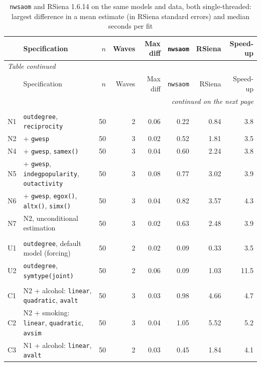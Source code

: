 {\footnotesize
\begin{longtable}{l>{\raggedright\arraybackslash}p{}rrrrrr}
\caption{\texttt{nwsaom} and RSiena 1.6.14 on the same models and data, both single-threaded: largest difference in a mean estimate (in RSiena standard errors) and median seconds per fit}\label{tab:bench}\\
\toprule
 & Specification & $n$ & Waves & Max diff & \texttt{nwsaom} & RSiena & Speed-up \\
\midrule
\endfirsthead
\multicolumn{8}{l}{\textit{Table \thetable{} continued}}\\
\toprule
 & Specification & $n$ & Waves & Max diff & \texttt{nwsaom} & RSiena & Speed-up \\
\midrule
\endhead
\midrule
\multicolumn{8}{r}{\textit{continued on the next page}}\\
\endfoot
\bottomrule
\endlastfoot
\multicolumn{8}{l}{\textit{Network}} \\
N1 & \texttt{outdegree}, \texttt{reciprocity} & 50 & 2 & 0.06 & 0.22 & 0.84 & 3.8 \\
N2 & + \texttt{gwesp} & 50 & 3 & 0.02 & 0.52 & 1.81 & 3.5 \\
N4 & + \texttt{gwesp}, \texttt{samex()} & 50 & 3 & 0.04 & 0.60 & 2.24 & 3.8 \\
N5 & + \texttt{gwesp}, \texttt{indegpopularity}, \texttt{outactivity} & 50 & 3 & 0.08 & 0.77 & 3.02 & 3.9 \\
N6 & + \texttt{gwesp}, \texttt{egox()}, \texttt{altx()}, \texttt{simx()} & 50 & 3 & 0.04 & 0.82 & 3.57 & 4.3 \\
N7 & N2, unconditional estimation & 50 & 3 & 0.02 & 0.63 & 2.48 & 3.9 \\
\addlinespace
\multicolumn{8}{l}{\textit{Undirected}} \\
U1 & \texttt{outdegree}, default model (forcing) & 50 & 2 & 0.02 & 0.09 & 0.33 & 3.5 \\
U2 & \texttt{outdegree}, \texttt{symtype(joint)} & 50 & 2 & 0.06 & 0.09 & 1.03 & 11.5 \\
\addlinespace
\multicolumn{8}{l}{\textit{Co-evolution}} \\
C1 & N2 + alcohol: \texttt{linear}, \texttt{quadratic}, \texttt{avalt} & 50 & 3 & 0.03 & 0.98 & 4.66 & 4.7 \\
C2 & N2 + smoking: \texttt{linear}, \texttt{quadratic}, \texttt{avsim} & 50 & 3 & 0.04 & 1.05 & 5.52 & 5.2 \\
C3 & N1 + alcohol: \texttt{linear}, \texttt{avalt} & 50 & 2 & 0.03 & 0.45 & 1.84 & 4.1 \\

\end{longtable}}
